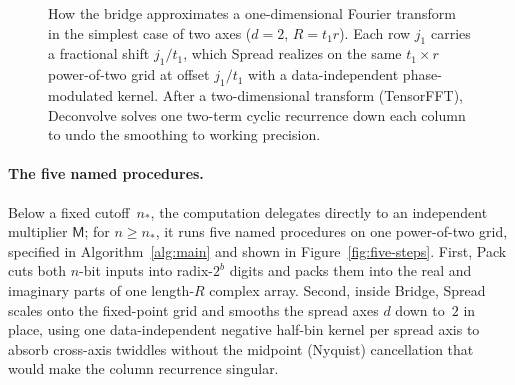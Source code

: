 \begin{figure}[!ht]
\caption{How the bridge approximates a one-dimensional Fourier transform in the simplest case of two axes ($d=2$, $R=t_1 r$). Each row $j_1$ carries a fractional shift $j_1/t_1$, which \textsf{Spread} realizes on the same $t_1\times r$ power-of-two grid at offset $j_1/t_1$ with a data-independent phase-modulated kernel. After a two-dimensional transform (\textsf{TensorFFT}), \textsf{Deconvolve} solves one two-term cyclic recurrence down each column to undo the smoothing to working precision.}
\label{fig:two-axis-showcase}
\end{figure}

\paragraph{The five named procedures.}
Below a fixed cutoff~$n_*$, the computation delegates directly to an independent multiplier $\mathsf M$; for $n\ge n_*$, it runs five named procedures on one power-of-two grid, specified in Algorithm~\ref{alg:main} and shown in Figure~\ref{fig:five-steps}. First, \textsf{Pack} cuts both $n$-bit inputs into radix-$2^b$ digits and packs them into the real and imaginary parts of one length-$R$ complex array. Second, inside \textsf{Bridge}, \textsf{Spread} scales onto the fixed-point grid and smooths the spread axes $d$ down to~$2$ in place, using one data-independent negative half-bin kernel per spread axis to absorb cross-axis twiddles without the midpoint (Nyquist) cancellation that would make the column recurrence singular.

